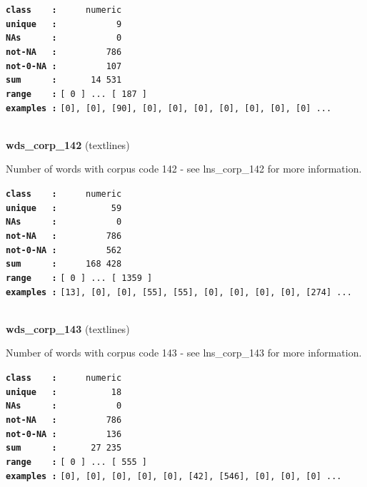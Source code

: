 \documentclass[]{article}
\begin{document}
\textbf{\texttt{class\ \ \ \ :}} \texttt{~~~~~numeric}\\
\textbf{\texttt{unique\ \ \ :}} \texttt{~~~~~~~~~~~9}\\
\textbf{\texttt{NAs\ \ \ \ \ \ :}} \texttt{~~~~~~~~~~~0}\\
\textbf{\texttt{not-NA\ \ \ :}} \texttt{~~~~~~~~~786}\\
\textbf{\texttt{not-0-NA\ :}} \texttt{~~~~~~~~~107}\\
\textbf{\texttt{sum\ \ \ \ \ \ :}} \texttt{~~~~~~14~531}\\
\textbf{\texttt{range\ \ \ \ :}}
\texttt{{[}\ 0\ {]}\ ...\ {[}\ 187\ {]}}\\
\textbf{\texttt{examples\ :}}
\texttt{{[}0{]},\ {[}0{]},\ {[}90{]},\ {[}0{]},\ {[}0{]},\ {[}0{]},\ {[}0{]},\ {[}0{]},\ {[}0{]},\ {[}0{]}\ ...}\\

~

\textbf{wds\_corp\_142} (textlines)

Number of words with corpus code 142 - see lns\_corp\_142 for more
information.

\textbf{\texttt{class\ \ \ \ :}} \texttt{~~~~~numeric}\\
\textbf{\texttt{unique\ \ \ :}} \texttt{~~~~~~~~~~59}\\
\textbf{\texttt{NAs\ \ \ \ \ \ :}} \texttt{~~~~~~~~~~~0}\\
\textbf{\texttt{not-NA\ \ \ :}} \texttt{~~~~~~~~~786}\\
\textbf{\texttt{not-0-NA\ :}} \texttt{~~~~~~~~~562}\\
\textbf{\texttt{sum\ \ \ \ \ \ :}} \texttt{~~~~~168~428}\\
\textbf{\texttt{range\ \ \ \ :}}
\texttt{{[}\ 0\ {]}\ ...\ {[}\ 1359\ {]}}\\
\textbf{\texttt{examples\ :}}
\texttt{{[}13{]},\ {[}0{]},\ {[}0{]},\ {[}55{]},\ {[}55{]},\ {[}0{]},\ {[}0{]},\ {[}0{]},\ {[}0{]},\ {[}274{]}\ ...}\\

~

\textbf{wds\_corp\_143} (textlines)

Number of words with corpus code 143 - see lns\_corp\_143 for more
information.

\textbf{\texttt{class\ \ \ \ :}} \texttt{~~~~~numeric}\\
\textbf{\texttt{unique\ \ \ :}} \texttt{~~~~~~~~~~18}\\
\textbf{\texttt{NAs\ \ \ \ \ \ :}} \texttt{~~~~~~~~~~~0}\\
\textbf{\texttt{not-NA\ \ \ :}} \texttt{~~~~~~~~~786}\\
\textbf{\texttt{not-0-NA\ :}} \texttt{~~~~~~~~~136}\\
\textbf{\texttt{sum\ \ \ \ \ \ :}} \texttt{~~~~~~27~235}\\
\textbf{\texttt{range\ \ \ \ :}}
\texttt{{[}\ 0\ {]}\ ...\ {[}\ 555\ {]}}\\
\textbf{\texttt{examples\ :}}
\texttt{{[}0{]},\ {[}0{]},\ {[}0{]},\ {[}0{]},\ {[}0{]},\ {[}42{]},\ {[}546{]},\ {[}0{]},\ {[}0{]},\ {[}0{]}\ ...}\\
\end{document}
